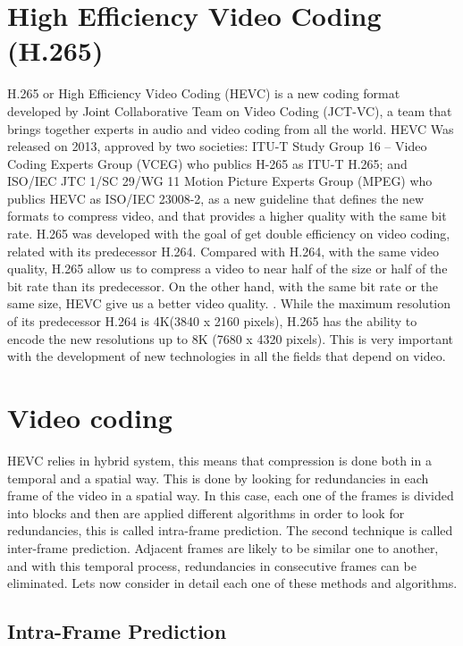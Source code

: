 \documentclass[10pt,journal,compsoc]{IEEEtran}
\begin{document}
\section{High Efficiency Video Coding (H.265)}

H.265 or High Efficiency Video Coding (HEVC) is a new coding format developed by Joint Collaborative Team on Video Coding (JCT-VC), a team that brings together experts in audio and video coding from all the world. HEVC Was released on 2013, approved by two societies: ITU-T Study Group 16 – Video Coding Experts Group (VCEG) who publics H-265 as ITU-T H.265; and ISO/IEC JTC 1/SC 29/WG 11 Motion Picture Experts Group (MPEG) who publics HEVC as ISO/IEC 23008-2, as a new guideline that defines the new formats to compress video, and that provides a higher quality with the same bit rate. H.265 was developed with the goal of get double efficiency on video coding, related with its predecessor H.264. Compared with H.264, with the same video quality, H.265 allow us to compress a video to near half of the size or half of the bit rate than its predecessor. On the other hand, with the same bit rate or the same size, HEVC give us a better video quality. \cite{queesh265}. While the maximum resolution of its predecessor H.264 is 4K(3840 x 2160 pixels), H.265 has the ability to encode the new resolutions up to 8K (7680 x 4320 pixels). \cite{estudio} This is very important with the development of new technologies in all the fields that depend on video.


\section{Video coding}

HEVC relies in hybrid system, this means that compression is done both in a temporal and a spatial way. This is done by looking for redundancies in each frame of the video in a spatial way. In this case, each one of the frames is divided into blocks and then are applied different algorithms in order to look for redundancies, this is called intra-frame prediction. The second technique is called inter-frame prediction. Adjacent frames are likely to be similar one to another, and with this temporal process, redundancies in consecutive frames can be eliminated. Lets now consider in detail each one of these methods and algorithms. \cite{simple}


\subsection{Intra-Frame Prediction}
\end{document}
